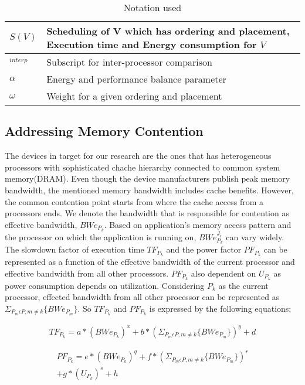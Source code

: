 \begin{table}[]
\begin{tabular}{| P{1cm} | p{6.5cm} |}
$S(V)$ & Scheduling of V which has ordering and placement, Execution time and Energy consumption for $V$\\  \hline
${}_{interp}$ & Subscript for inter-processor comparison\\  \hline
$\alpha$ & Energy and performance balance parameter\\  \hline
$\omega$ & Weight for a given ordering and placement \\  \hline
\end{tabular}
\caption{Notation used}
\label{table:notation}
\vspace{-0.15in}
\end{table}


\subsection{Addressing Memory Contention}
The devices in target for our research are the ones that has heterogeneous processors with sophisticated 
chache hierarchy connected to common system memory(DRAM). Even though the device manufacturers publish
peak memory bandwidth, the mentioned memory bandwidth includes cache benefits. However,
the common contention point starts from where the cache access from a processors ends. We denote the bandwidth 
that is responsible for contention as effective bandwidth, $BWe_{P_k}$. Based on application's memory access
pattern and the processor on which the application is running on, $BWe_{P_k}^{J_i}$ 
can vary widely. The slowdown factor of execution time $TF_{P_k}$ and the power factor $PF_{P_k}$ can be 
represented as a function  
of the effective bandwidth of the current processor and effective bandwidth from all other processors. 
$PF_{P_k}$ also dependent on $U_{P_k}$ as power consumption depends on utilization.
Considering $P_k$ as the current processor, effected bandwidth from all other processor can be 
represented as $\Sigma_{P_m \epsilon P, m \neq k} \{BWe_{P_m}\}$. So $TF_{P_k}$ and $PF_{P_k}$ is expressed 
by the following equations:


\begin{equation}
\begin{split}
TF_{P_k} = a*(BWe_{P_k})^x + b*(\Sigma_{P_m \epsilon P, m \neq k} \{BWe_{P_m}\})^y + d 
\end{split}
\label{eq:tf}
\end{equation}

\begin{equation}
\begin{split}
PF_{P_k} = e*(BWe_{P_k})^q + f*(\Sigma_{P_m \epsilon P, m \neq k} \{BWe_{P_m}\})^r \\ + g*(U_{P_k})^s + h 
\end{split}
\label{eq:pf}
\end{equation}

